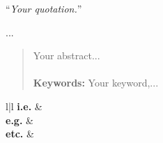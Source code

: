 \documentclass[
11pt, %
english, %
doublespacing, %
liststotoc, %
headsepline, %
]{MastersDoctoralThesis} %
\begin{document}
	\vspace*{0.2\textheight}
	
	\noindent\enquote{\itshape Your quotation.}\bigbreak
	
	\hfill ...
	

	\begin{abstract}
		\addchaptertocentry{\abstractname} %
		Your abstract...
		\\
		\\		
		{\bf Keywords: } Your keyword,...
	\end{abstract}
%	


	\setcounter{tocdepth}{1}
	\tableofcontents %
	
	\listoffigures %
	
	\listoftables %
	
	
	 \begin{abbreviations}{l|l} %
	 \textbf{i.e.} &  \\
	 \textbf{e.g.} &  \\
	 \textbf{etc.} & 
	 \end{abbreviations}
	
	
	\mainmatter %
	
	\pagestyle{thesis} %
	
\end{document}
